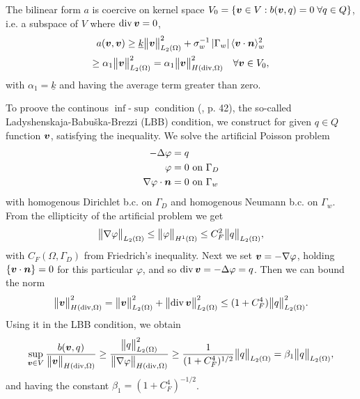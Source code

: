 The bilinear form $a$ is coercive on kernel space $V_0=\{\mathbf{\boldsymbol{v}}\in V: b(\mathbf{\boldsymbol{v}},q)=0\;\forall q\in Q\}$, i.e.
a subspace of $V$ where ${\rm div}\,\mathbf{\boldsymbol{v}}=0$,
\begin{multline} \label{eqn:form_a_coercivity_V0}
    a(\mathbf{\boldsymbol{v}},\mathbf{\boldsymbol{v}}) \geq \underline{k} \bigl\Vert\mathbf{\boldsymbol{v}}\bigr\Vert^2_{L_2(\Omega)}
                + \sigma_w^{-1}\left|\Gamma_w\right|\langle\mathbf{\boldsymbol{v}}\cdot\mathbf{\boldsymbol{n}}\rangle_w^2 \\
        \geq  \alpha_1 \bigl\Vert\mathbf{\boldsymbol{v}}\bigr\Vert^2_{L_2(\Omega)} = \alpha_1 \bigl\Vert\mathbf{\boldsymbol{v}}\bigr\Vert^2_{H({\rm div},\Omega)} \quad \forall \mathbf{\boldsymbol{v}}\in V_0,
\end{multline}
with $\alpha_1=\underline{k}$ and having the average term greater than zero.

To proove the continous $\inf$-$\sup$ condition (\cite{brezzi_mixed_1991}, p. 42),
the so-called Ladyshenskaja-Babu{\v s}ka-Brezzi (LBB) condition,
we construct for given $q\in Q$ function $\mathbf{\boldsymbol{v}}$, satisfying the inequality.
We solve the artificial Poisson problem
\begin{equation} \label{eqn:lbb_artificial_poisson}
\begin{aligned}
    -\Delta\varphi &= q\\
    \varphi &= 0 \textrm{ on } \Gamma_D \\
    \nabla\varphi\cdot\mathbf{\boldsymbol{n}} &= 0 \textrm{ on } \Gamma_w
\end{aligned}
\end{equation}
with homogenous Dirichlet b.c. on $\Gamma_D$ and homogenous Neumann b.c. on $\Gamma_w$.
From the ellipticity of the artificial problem we get
\begin{equation}
    \bigl\Vert\nabla\varphi\bigr\Vert_{L_2(\Omega)} \leq \bigl\Vert\varphi\bigr\Vert_{H^1(\Omega)}
        \leq C_F^2 \bigl\Vert q\bigr\Vert_{L_2(\Omega)},
\end{equation}
with $C_F(\Omega,\Gamma_D)$ from Friedrich's inequality.
Next we set $\mathbf{\boldsymbol{v}} = -\nabla \varphi$, holding $\{\mathbf{\boldsymbol{v}}\cdot\mathbf{\boldsymbol{n}}\}=0$ for this particular $\varphi$,
and so ${\rm div}\,\mathbf{\boldsymbol{v}} = -\Delta\varphi=q$. Then we can bound the norm
\begin{equation}
    \bigl\Vert\mathbf{\boldsymbol{v}}\bigr\Vert^2_{H({\rm div},\Omega)} = \bigl\Vert\mathbf{\boldsymbol{v}}\bigr\Vert^2_{L_2(\Omega)} 
        + \bigl\Vert{\rm div}\,\mathbf{\boldsymbol{v}}\bigr\Vert^2_{L_2(\Omega)}
        \leq (1+C_F^4) \bigl\Vert q\bigr\Vert^2_{L_2(\Omega)}.
\end{equation}
Using it in the LBB condition, we obtain
\begin{equation} \label{eqn:form_b_lbb}
    \sup_{\mathbf{\boldsymbol{v}}\in V} \frac{b(\mathbf{\boldsymbol{v}},q)}{\bigl\Vert\mathbf{\boldsymbol{v}}\bigr\Vert_{H({\rm div},\Omega)}} \geq
    \frac{\bigl\Vert q\bigr\Vert^2_{L_2(\Omega)}}{\bigl\Vert\nabla\varphi\bigr\Vert_{H({\rm div},\Omega)}}
    \geq \frac{1}{(1+C_F^4)^{1/2}} \bigl\Vert q\bigr\Vert_{L_2(\Omega)} = \beta_1 \bigl\Vert q\bigr\Vert_{L_2(\Omega)},
\end{equation}
and having the constant $\beta_1 = (1+C_F^4)^{-1/2}$.


